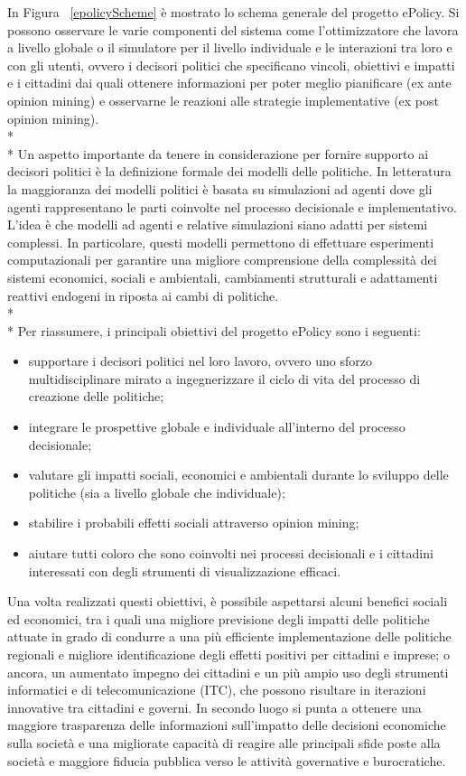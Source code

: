\documentclass[12pt,a4paper,openright,twoside]{report}
\begin{document}
In Figura ~\ref{epolicyScheme} è mostrato lo schema generale del progetto ePolicy. Si possono osservare le varie componenti del sistema come l'ottimizzatore che lavora a livello globale o il simulatore per il livello individuale e le interazioni tra loro e con gli utenti, ovvero i decisori politici che specificano vincoli, obiettivi e impatti e i cittadini dai quali ottenere informazioni per poter meglio pianificare (ex ante opinion mining) e osservarne le reazioni alle strategie implementative (ex post opinion mining).\\*\\*
Un aspetto importante da tenere in considerazione per fornire supporto ai decisori politici è la definizione formale dei modelli delle politiche. In letteratura la maggioranza dei modelli politici è basata su simulazioni ad agenti \cite{AgentBaseLandUseModel,Nigel,socialScienceMicrosim} dove gli agenti rappresentano le parti coinvolte nel processo decisionale e implementativo. L'idea è che modelli ad agenti e relative simulazioni siano adatti per sistemi complessi. In particolare, questi modelli permettono di effettuare esperimenti computazionali per garantire una migliore comprensione della complessità dei sistemi economici, sociali e ambientali, cambiamenti strutturali e adattamenti reattivi endogeni in riposta ai cambi di politiche.
\\*\\*
Per riassumere, i principali obiettivi del progetto ePolicy sono i seguenti:
\begin{itemize}
\item supportare i decisori politici nel loro lavoro, ovvero uno sforzo multidisciplinare mirato a ingegnerizzare il ciclo di vita del processo di creazione delle politiche;
\item integrare le prospettive globale e individuale all'interno del processo decisionale;
\item valutare gli impatti sociali, economici e ambientali durante lo sviluppo delle politiche (sia a livello globale che individuale);
\item stabilire i probabili effetti sociali attraverso opinion mining;
\item aiutare tutti coloro che sono coinvolti nei processi decisionali e i cittadini interessati con degli strumenti di visualizzazione efficaci.
\end{itemize}
Una volta realizzati questi obiettivi, è possibile aspettarsi alcuni benefici sociali ed economici, tra i quali una migliore previsione degli impatti delle politiche attuate in grado di condurre a una più efficiente implementazione delle politiche regionali e migliore identificazione degli effetti positivi per cittadini e imprese; o ancora, un aumentato impegno dei cittadini e un più ampio uso degli strumenti informatici e di telecomunicazione (ITC), che possono risultare in iterazioni innovative tra cittadini e governi. In secondo luogo si punta a ottenere una maggiore trasparenza delle informazioni sull'impatto delle decisioni economiche sulla società e una migliorate capacità di reagire alle principali sfide poste alla società e maggiore fiducia pubblica verso le attività governative e burocratiche.
\end{document}

